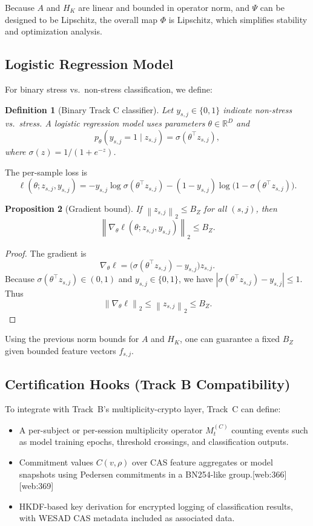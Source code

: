 \documentclass[11pt]{article}
\newtheorem{definition}{Definition}[section]
\newtheorem{proposition}[definition]{Proposition}
\newcommand{\R}{\mathbb{R}}
\newcommand{\norm}[1]{\left\lVert #1 \right\rVert}
\newcommand{\abs}[1]{\left\lvert #1 \right\rvert}
\begin{document}
Because \(A\) and \(H_K\) are linear and bounded in operator norm, and \(\Psi\) can be designed to be Lipschitz, the overall map \(\Phi\) is Lipschitz, which simplifies stability and optimization analysis.

\subsection{Logistic Regression Model}

For binary stress vs.\ non-stress classification, we define:

\begin{definition}[Binary Track C classifier]
Let \(y_{s,j} \in \{0,1\}\) indicate non-stress vs.\ stress.
A logistic regression model uses parameters \(\theta \in \R^D\) and
\[
  p_{\theta}(y_{s,j}=1 \mid z_{s,j}) = \sigma(\theta^\top z_{s,j}),
\]
where \(\sigma(z) = 1/(1+e^{-z})\).
\end{definition}

The per-sample loss is
\[
  \ell(\theta; z_{s,j}, y_{s,j})
  = -y_{s,j} \log \sigma(\theta^\top z_{s,j})
    - (1-y_{s,j}) \log \bigl(1-\sigma(\theta^\top z_{s,j})\bigr).
\]

\begin{proposition}[Gradient bound]
If \(\norm{z_{s,j}}_2 \le B_Z\) for all \((s,j)\), then
\[
  \norm{\nabla_\theta \ell(\theta; z_{s,j}, y_{s,j})}_2 \le B_Z.
\]
\end{proposition}

\begin{proof}
The gradient is
\[
  \nabla_\theta \ell = \bigl(\sigma(\theta^\top z_{s,j}) - y_{s,j}\bigr) z_{s,j}.
\]
Because \(\sigma(\theta^\top z_{s,j}) \in (0,1)\) and \(y_{s,j} \in \{0,1\}\), we have \(\abs{\sigma(\theta^\top z_{s,j}) - y_{s,j}} \le 1\).
Thus
\[
  \norm{\nabla_\theta \ell}_2 \le \norm{z_{s,j}}_2 \le B_Z.
\]
\end{proof}

Using the previous norm bounds for \(A\) and \(H_K\), one can guarantee a fixed \(B_Z\) given bounded feature vectors \(f_{s,j}\).

\subsection{Certification Hooks (Track B Compatibility)}

To integrate with Track~B's multiplicity-crypto layer, Track~C can define:

\begin{itemize}
  \item A per-subject or per-session multiplicity operator \(M_t^{(C)}\) counting events such as model training epochs, threshold crossings, and classification outputs.
  \item Commitment values \(C(v,\rho)\) over CAS feature aggregates or model snapshots using Pedersen commitments in a BN254-like group.\cite{Pedersen_ZKDocs,Pedersen_RareSkills}[web:366][web:369]
  \item HKDF-based key derivation for encrypted logging of classification results, with WESAD CAS metadata included as associated data.
\end{itemize}
\end{document}
